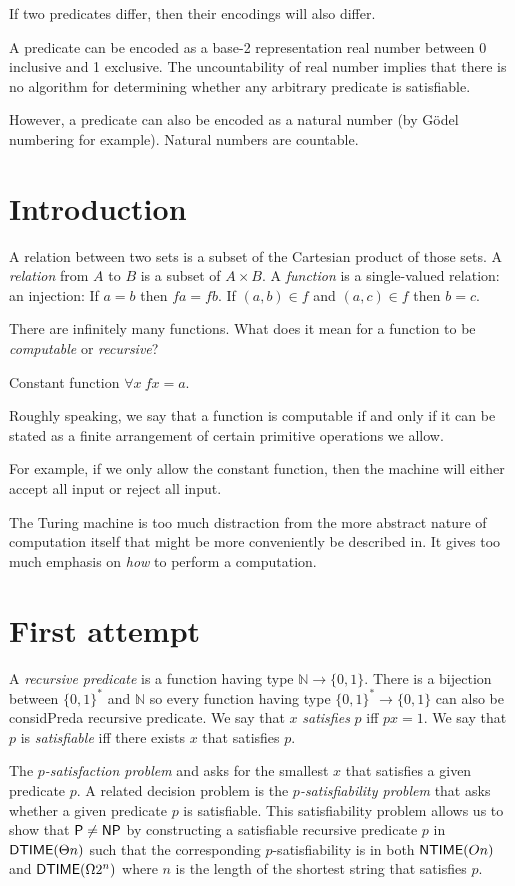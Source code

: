 If two predicates differ, then their encodings will also differ.

A predicate can be encoded as a base-2 representation real number
between 0 inclusive and 1 exclusive.
The uncountability of real number implies that there is no algorithm
for determining whether any arbitrary predicate is satisfiable.

However, a predicate can also be encoded as a natural number
(by G\"odel numbering for example).
Natural numbers are countable.

\section{Introduction}

A relation between two sets is a subset of the Cartesian product of those sets.
A \emph{relation} from $A$ to $B$ is a subset of $A \times B$.
A \emph{function} is a single-valued relation:
an injection:
If $a = b$ then $f a = f b$.
If $(a,b) \in f$ and $(a,c) \in f$ then $b = c$.

There are infinitely many functions.
What does it mean for a function to be \emph{computable} or \emph{recursive}?

Constant function $\forall x ~ f x = a$.

Roughly speaking, we say that a function is computable
if and only if it can be stated as a finite arrangement
of certain primitive operations we allow.

For example, if we only allow the constant function,
then the machine will either accept all input or reject all input.

The Turing machine is too much distraction
from the more abstract nature of computation itself
that might be more conveniently be described in.
It gives too much emphasis on \emph{how} to perform a computation.

\section{First attempt}

A \emph{recursive predicate} is a function having type $\mathbb N \to \{0,1\}$.
There is a bijection between $\{0,1\}^*$ and $\mathbb N$
so every function having type $\{0,1\}^* \to \{0,1\}$ can also be considPred{a} recursive predicate.
We say that $x$ \emph{satisfies} $p$ iff $px = 1$.
We say that $p$ is \emph{satisfiable} iff there exists $x$ that satisfies $p$.

The \emph{$p$-satisfaction problem}
and asks for the smallest $x$ that satisfies a given predicate $p$.
A related decision problem is the \emph{$p$-satisfiability problem} that
asks whether a given predicate $p$ is satisfiable.
This satisfiability problem allows us to show that $\mathsf{P} \neq \mathsf{NP}$
by constructing a satisfiable recursive predicate
$p$ in $\operatorname{\mathsf{DTIME}}(\Theta n)$ such that
the corresponding $p$-satisfiability is in both $\operatorname{\mathsf{NTIME}}(On)$ and $\operatorname{\mathsf{DTIME}}(\Omega 2^n)$
where $n$ is the length of the shortest string that satisfies $p$.

